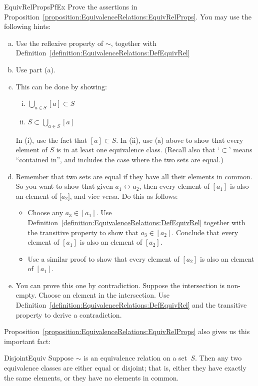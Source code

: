 \begin{exercise}{EquivRelPropsPfEx}
Prove the assertions in Proposition~\ref{proposition:EquivalenceRelations:EquivRelProps}. You may use the following hints:
\begin{enumerate}[(a)]
\item
Use the reflexive property of $\sim$, together with Definition~\ref{definition:EquivalenceRelations:DefEquivRel}
\item
Use part (a).
\item
This can be done by showing:
\begin{enumerate}[(i)]
\item 
$\bigcup_{a \in S} [a] \subset S$
\item
$S \subset \bigcup_{a \in S} [a]$
\end{enumerate}
In (i), use the fact that $[a] \subset S$.  In (ii), use (a) above to show that every element of $S$ is in at least one equivalence class. (Recall also that `$\subset$' means ``contained in'', and  includes the case where the two sets are equal.)
\item
Remember that two sets are equal if they have all their elements in common. So you want to show that given $a_1 \rel a_2$, then every element of $[a_1]$ is also an element of [$a_2]$, and vice versa. Do this as follows: 
\begin{itemize}
\item
Choose any $a_3 \in [a_1]$. Use Definition~\ref{definition:EquivalenceRelations:DefEquivRel} together with the transitive property to show that $a_3 \in [a_2]$. Conclude that every element of $[a_1]$ is also an element of $[a_2]$. 
\item
Use a similar proof to show that every element of $[a_2]$ is also an element of $[a_1]$.
\end{itemize}
\item
You can prove this one by contradiction. Suppose the intersection is non-empty. Choose an element in the intersection. Use Definition~\ref{definition:EquivalenceRelations:DefEquivRel} and the transitive property to derive a contradiction.
\end{enumerate}
\end{exercise}

Proposition~\ref{proposition:EquivalenceRelations:EquivRelProps} also gives us this important fact:

\begin{prop}{DisjointEquiv}
Suppose $\sim$ is an equivalence relation on a set~$S$. Then any two equivalence classes are either equal or disjoint; that is, either they have exactly the same elements, or they have no elements in common. 
\end{prop}


